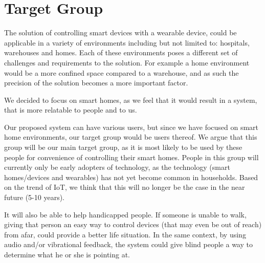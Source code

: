 \section{Target Group}\label{sec:target-group}

The solution of controlling smart devices with a wearable device, 
could be applicable in a variety of environments including but not limited to: hospitals, warehouses and homes.
Each of these environments poses a different set of challenges and requirements to the solution.
For example a home environment would be a more confined space compared to a warehouse, 
and as such the precision of the solution becomes a more important factor.

We decided to focus on smart homes, 
as we feel that it would result in a system, 
that is more relatable to people and to us.

Our proposed system can have various users, 
but since we have focused on smart home environments, 
our target group would be users thereof. 
We argue that this group will be our main target group, 
as it is most likely to be used by these people for convenience of controlling their smart homes. 
People in this group will currently only be early adopters of technology, 
as the technology (smart homes/devices and wearables) has not yet become common in households.
Based on the trend of IoT, we think that this will no longer be the case in the near future (5-10 years). 

It will also be able to help handicapped people. 
If someone is unable to walk, 
giving that person an easy way to control devices (that may even be out of reach) from afar, 
could provide a better life situation. 
In the same context, by using audio and/or vibrational feedback, 
the system could give blind people a way to determine what he or she is pointing at. 
